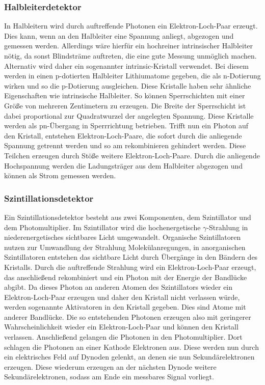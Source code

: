 \subsubsection{Halbleiterdetektor}
In Halbleitern wird durch auftreffende Photonen ein Elektron-Loch-Paar erzeugt. Dies kann, wenn an den Halbleiter eine Spannung anliegt, abgezogen und gemessen werden. Allerdings wäre hierfür ein hochreiner intrinsischer Halbleiter nötig, da sonst Blindsträme auftreten, die eine gute Messung unmöglich machen. Alternativ wird daher ein sogenannter intrinsic-Kristall verwendet. Bei diesem werden in einen p-dotierten Halbleiter Lithiumatome gegeben, die als n-Dotierung wirken und so die p-Dotierung ausgleichen. Diese Kristalle haben sehr ähnliche Eigenschaften wie intrinsische Halbleiter. So können Sperrschichten mit einer Größe von mehreren Zentimetern zu erzeugen. Die Breite der Sperrschicht ist dabei proportional zur Quadratwurzel der angelegten Spannung. Diese Kristalle werden als pn-Übergang in Sperrrichtung betrieben. Trifft nun ein Photon auf den Kristall, entstehen Elektron-Loch-Paare, die sofort durch die anliegende Spannung getrennt werden und so am rekombinieren gehindert werden. Diese Teilchen erzeugen durch Stöße weitere Elektron-Loch-Paare. Durch die anliegende Hochspannung werden die Ladungsträger aus dem Halbleiter abgezogen und können als Strom gemessen werden.

\subsubsection{Szintillationsdetektor}
Ein Szintillationsdetektor besteht aus zwei Komponenten, dem Szintillator und dem Photomultiplier. Im Szintillator wird die hochenergetische $\gamma$-Strahlung in niederenergetisches sichtbares Licht umgewandelt. Organische Szintillatoren nutzen zur Umwandlung der Strahlung Molekülanregungen, in anorganischen Szintillatoren entstehen das sichtbare Licht durch Übergänge in den Bändern des Kristalls. Durch die auftreffende Strahlung wird ein Elektron-Loch-Paar erzeugt, das anschließend rekombiniert und ein Photon mit der Energie der Bandlücke abgibt. Da dieses Photon an anderen Atomen des Szintillators wieder ein Elektron-Loch-Paar erzeugen und daher den Kristall nicht verlassen würde, werden sogenannte Aktivatoren in den Kristall gegeben. Dies sind Atome mit anderer Bandlücke. Die so entstehenden Photonen erzeugen also mit geringerer Wahrscheinlichkeit wieder ein Elektron-Loch-Paar und können den Kristall verlassen. Anschließend gelangen die Photonen in den Photomultiplier. Dort schlagen die Photonen an einer Kathode Elektronen aus. Diese werden nun durch ein elektrisches Feld auf Dynoden gelenkt, an denen sie nun Sekundärelektronen erzeugen. Diese wiederum erzeugen an der nächsten Dynode weitere Sekundärelektronen, sodass am Ende ein messbares Signal vorliegt.

